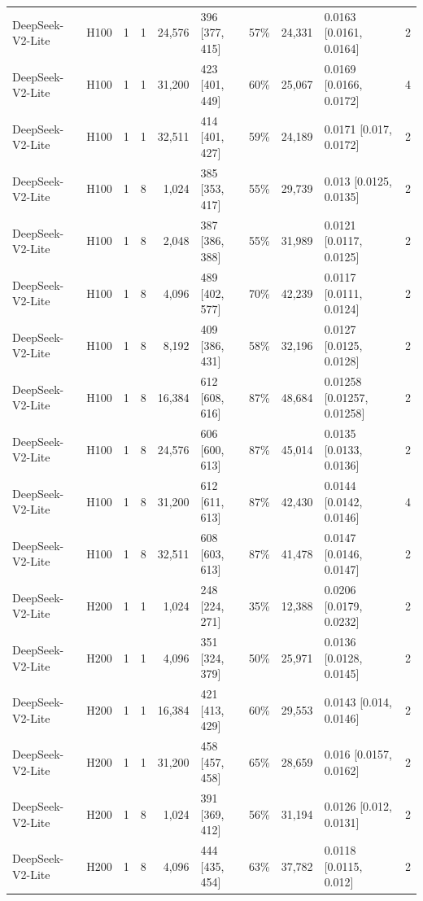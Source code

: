 \begin{landscape}
\begin{longtable}{llrrrlrrlr}
DeepSeek-V2-Lite & H100 & 1 & 1 & 24,576 & 396 {[}377, 415{]} & 57\% & 24,331 & 0.0163 {[}0.0161, 0.0164{]} & 2 \\
DeepSeek-V2-Lite & H100 & 1 & 1 & 31,200 & 423 {[}401, 449{]} & 60\% & 25,067 & 0.0169 {[}0.0166, 0.0172{]} & 4 \\
DeepSeek-V2-Lite & H100 & 1 & 1 & 32,511 & 414 {[}401, 427{]} & 59\% & 24,189 & 0.0171 {[}0.017, 0.0172{]} & 2 \\
DeepSeek-V2-Lite & H100 & 1 & 8 & 1,024 & 385 {[}353, 417{]} & 55\% & 29,739 & 0.013 {[}0.0125, 0.0135{]} & 2 \\
DeepSeek-V2-Lite & H100 & 1 & 8 & 2,048 & 387 {[}386, 388{]} & 55\% & 31,989 & 0.0121 {[}0.0117, 0.0125{]} & 2 \\
DeepSeek-V2-Lite & H100 & 1 & 8 & 4,096 & 489 {[}402, 577{]} & 70\% & 42,239 & 0.0117 {[}0.0111, 0.0124{]} & 2 \\
DeepSeek-V2-Lite & H100 & 1 & 8 & 8,192 & 409 {[}386, 431{]} & 58\% & 32,196 & 0.0127 {[}0.0125, 0.0128{]} & 2 \\
DeepSeek-V2-Lite & H100 & 1 & 8 & 16,384 & 612 {[}608, 616{]} & 87\% & 48,684 & 0.01258 {[}0.01257, 0.01258{]} & 2 \\
DeepSeek-V2-Lite & H100 & 1 & 8 & 24,576 & 606 {[}600, 613{]} & 87\% & 45,014 & 0.0135 {[}0.0133, 0.0136{]} & 2 \\
DeepSeek-V2-Lite & H100 & 1 & 8 & 31,200 & 612 {[}611, 613{]} & 87\% & 42,430 & 0.0144 {[}0.0142, 0.0146{]} & 4 \\
DeepSeek-V2-Lite & H100 & 1 & 8 & 32,511 & 608 {[}603, 613{]} & 87\% & 41,478 & 0.0147 {[}0.0146, 0.0147{]} & 2 \\
DeepSeek-V2-Lite & H200 & 1 & 1 & 1,024 & 248 {[}224, 271{]} & 35\% & 12,388 & 0.0206 {[}0.0179, 0.0232{]} & 2 \\
DeepSeek-V2-Lite & H200 & 1 & 1 & 4,096 & 351 {[}324, 379{]} & 50\% & 25,971 & 0.0136 {[}0.0128, 0.0145{]} & 2 \\
DeepSeek-V2-Lite & H200 & 1 & 1 & 16,384 & 421 {[}413, 429{]} & 60\% & 29,553 & 0.0143 {[}0.014, 0.0146{]} & 2 \\
DeepSeek-V2-Lite & H200 & 1 & 1 & 31,200 & 458 {[}457, 458{]} & 65\% & 28,659 & 0.016 {[}0.0157, 0.0162{]} & 2 \\
DeepSeek-V2-Lite & H200 & 1 & 8 & 1,024 & 391 {[}369, 412{]} & 56\% & 31,194 & 0.0126 {[}0.012, 0.0131{]} & 2 \\
DeepSeek-V2-Lite & H200 & 1 & 8 & 4,096 & 444 {[}435, 454{]} & 63\% & 37,782 & 0.0118 {[}0.0115, 0.012{]} & 2 \\

\end{longtable}
\end{landscape}
